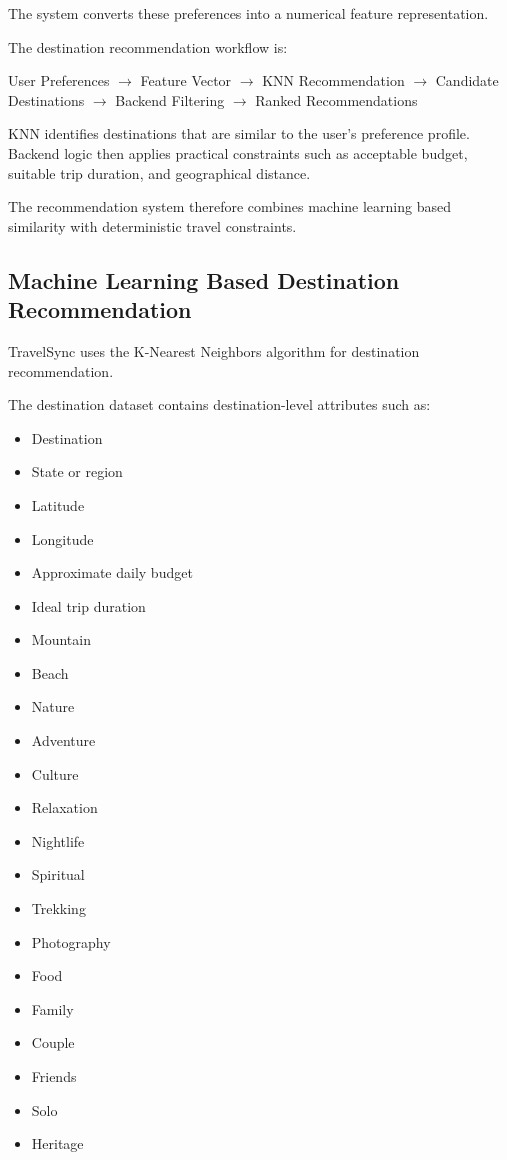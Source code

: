 \documentclass[11pt,a4paper]{article}
\begin{document}
The system converts these preferences into a numerical feature representation.

The destination recommendation workflow is:

\begin{center}
User Preferences
$\rightarrow$
Feature Vector
$\rightarrow$
KNN Recommendation
$\rightarrow$
Candidate Destinations
$\rightarrow$
Backend Filtering
$\rightarrow$
Ranked Recommendations
\end{center}

KNN identifies destinations that are similar to the user's preference profile. Backend logic then applies practical constraints such as acceptable budget, suitable trip duration, and geographical distance.

The recommendation system therefore combines machine learning based similarity with deterministic travel constraints.


\subsection{Machine Learning Based Destination Recommendation}

TravelSync uses the K-Nearest Neighbors algorithm for destination recommendation.

The destination dataset contains destination-level attributes such as:

\begin{itemize}
\item Destination
\item State or region
\item Latitude
\item Longitude
\item Approximate daily budget
\item Ideal trip duration
\item Mountain
\item Beach
\item Nature
\item Adventure
\item Culture
\item Relaxation
\item Nightlife
\item Spiritual
\item Trekking
\item Photography
\item Food
\item Family
\item Couple
\item Friends
\item Solo
\item Heritage
\end{itemize}
\end{document}
